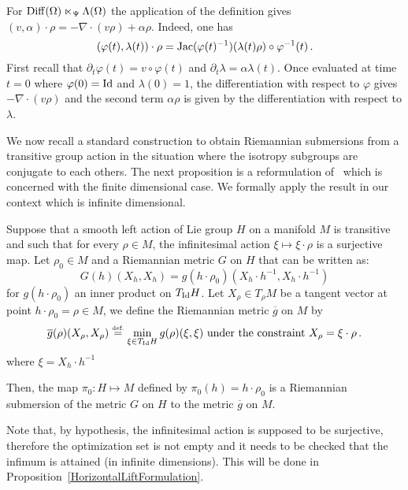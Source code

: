 \begin{example}\label{InfSemi}
For $\operatorname{Diff}(\Omega) \ltimes_\Psi \Lambda(\Omega)$ the application of the definition gives $(v,\alpha) \cdot \rho = -\nabla \cdot (v\rho) + \alpha \rho$. Indeed, one has
$$ (\varphi(t), \lambda(t)) \cdot \rho = \operatorname{Jac}(\varphi(t)^{-1}) (\lambda(t)\rho) \circ \varphi^{-1}(t)\,. $$
First recall that $\partial_t \varphi(t) = v \circ \varphi(t)$ and $\partial_t \lambda =\alpha \lambda(t)$.
Once evaluated at time $t=0$ where $\varphi(0) = \operatorname{Id}$ and $\lambda(0) = 1$, the differentiation with respect to $\varphi$ gives $-\nabla \cdot (v\rho)$ and the second term $\alpha \rho$ is given by the differentiation with respect to $\lambda$. 
\end{example}

We now recall a standard construction to obtain Riemannian submersions from a transitive group action in the situation where the isotropy subgroups are conjugate to each others. The next proposition is a reformulation of~\cite[Claim of Section 29.21]{Michor2008b} which is concerned with the finite dimensional case. We formally apply the result in our context which is infinite dimensional.

\begin{proposition}
Suppose that a smooth left action of Lie group $H$ on a manifold $M$ is transitive and such that for every $\rho \in M$, the infinitesimal action $\xi \mapsto \xi \cdot \rho$ is a surjective map. Let $\rho_0  \in M$ and a Riemannian metric $G$ on $H$ that can be written as: 
\begin{equation}G(h)(X_h,X_h) =  g(h\cdot \rho_0)(X_h \cdot h^{-1},X_h \cdot h^{-1})
\end{equation} for $ g(h\cdot \rho_0)$ an inner product on $T_{\operatorname{Id}}H$. Let $X_\rho \in T_\rho M$ be a tangent vector at point $h\cdot \rho_0 = \rho \in M$, we define the Riemannian metric $\overline{g}$ on $M$ by
\begin{equation}\label{HLift}
\overline{g}(\rho)(X_\rho,X_\rho) \stackrel{\mbox{\upshape\tiny def.}}{=} \min_{\xi \in T_{\operatorname{Id}} H} g(\rho)(\xi,\xi) \text{ under the constraint } X_\rho = \xi \cdot \rho \,.
\end{equation}
where $\xi = X_h \cdot h^{-1}$

Then, the map $\pi_0: H \mapsto M$ defined by $\pi_0(h) = h\cdot \rho_0$ is a Riemannian submersion of the metric $G$ on $H$ to the metric $\overline{g}$ on $M$.
\end{proposition} 
 Note that, by hypothesis, the infinitesimal action is supposed to be surjective, therefore the optimization set is not empty and it needs to be checked that the infimum is attained (in infinite dimensions). This will be done in Proposition~\ref{HorizontalLiftFormulation}. 
 
